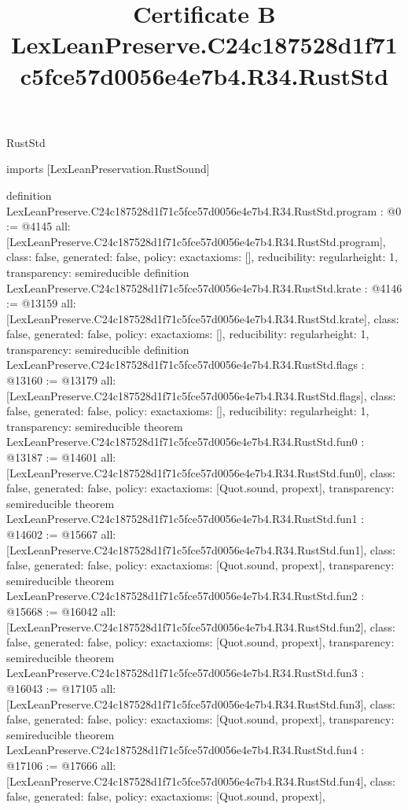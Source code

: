\begin{lexlean}{RustStd}
\title{Certificate B LexLeanPreserve.C24c187528d1f71c5fce57d0056e4e7b4.R34.RustStd}
\begin{coremodule}
imports [LexLeanPreservation.RustSound]

definition LexLeanPreserve.C24c187528d1f71c5fce57d0056e4e7b4.R34.RustStd.program : @0 := @4145 {
  all: [LexLeanPreserve.C24c187528d1f71c5fce57d0056e4e7b4.R34.RustStd.program],
  class: false,
  generated: false,
  policy: exact{axioms: []},
  reducibility: regular{height: 1},
  transparency: semireducible
}
definition LexLeanPreserve.C24c187528d1f71c5fce57d0056e4e7b4.R34.RustStd.krate : @4146 := @13159 {
  all: [LexLeanPreserve.C24c187528d1f71c5fce57d0056e4e7b4.R34.RustStd.krate],
  class: false,
  generated: false,
  policy: exact{axioms: []},
  reducibility: regular{height: 1},
  transparency: semireducible
}
definition LexLeanPreserve.C24c187528d1f71c5fce57d0056e4e7b4.R34.RustStd.flags : @13160 := @13179 {
  all: [LexLeanPreserve.C24c187528d1f71c5fce57d0056e4e7b4.R34.RustStd.flags],
  class: false,
  generated: false,
  policy: exact{axioms: []},
  reducibility: regular{height: 1},
  transparency: semireducible
}
theorem LexLeanPreserve.C24c187528d1f71c5fce57d0056e4e7b4.R34.RustStd.fun0 : @13187 := @14601 {
  all: [LexLeanPreserve.C24c187528d1f71c5fce57d0056e4e7b4.R34.RustStd.fun0],
  class: false,
  generated: false,
  policy: exact{axioms: [Quot.sound, propext]},
  transparency: semireducible
}
theorem LexLeanPreserve.C24c187528d1f71c5fce57d0056e4e7b4.R34.RustStd.fun1 : @14602 := @15667 {
  all: [LexLeanPreserve.C24c187528d1f71c5fce57d0056e4e7b4.R34.RustStd.fun1],
  class: false,
  generated: false,
  policy: exact{axioms: [Quot.sound, propext]},
  transparency: semireducible
}
theorem LexLeanPreserve.C24c187528d1f71c5fce57d0056e4e7b4.R34.RustStd.fun2 : @15668 := @16042 {
  all: [LexLeanPreserve.C24c187528d1f71c5fce57d0056e4e7b4.R34.RustStd.fun2],
  class: false,
  generated: false,
  policy: exact{axioms: [Quot.sound, propext]},
  transparency: semireducible
}
theorem LexLeanPreserve.C24c187528d1f71c5fce57d0056e4e7b4.R34.RustStd.fun3 : @16043 := @17105 {
  all: [LexLeanPreserve.C24c187528d1f71c5fce57d0056e4e7b4.R34.RustStd.fun3],
  class: false,
  generated: false,
  policy: exact{axioms: [Quot.sound, propext]},
  transparency: semireducible
}
theorem LexLeanPreserve.C24c187528d1f71c5fce57d0056e4e7b4.R34.RustStd.fun4 : @17106 := @17666 {
  all: [LexLeanPreserve.C24c187528d1f71c5fce57d0056e4e7b4.R34.RustStd.fun4],
  class: false,
  generated: false,
  policy: exact{axioms: [Quot.sound, propext]},
}
\end{coremodule}
\end{lexlean}
